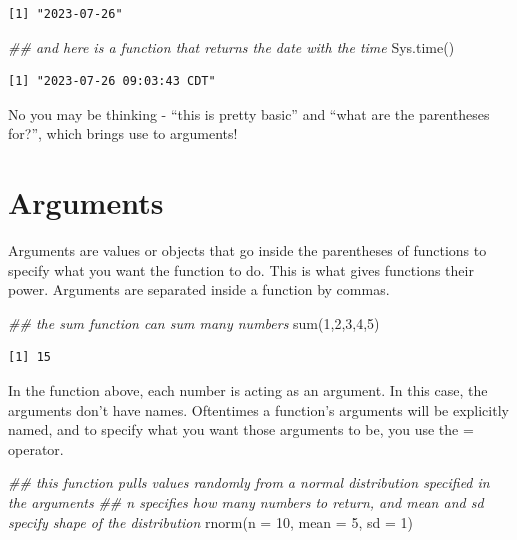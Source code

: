 \documentclass[
  letterpaper,
  DIV=11,
  numbers=noendperiod]{scrreprt}
\newenvironment{Shaded}{\begin{snugshade}}{\end{snugshade}}
\newcommand{\AttributeTok}[1]{\textcolor[rgb]{0.40,0.45,0.13}{#1}}
\newcommand{\DecValTok}[1]{\textcolor[rgb]{0.68,0.00,0.00}{#1}}
\newcommand{\DocumentationTok}[1]{\textcolor[rgb]{0.37,0.37,0.37}{\textit{#1}}}
\newcommand{\FunctionTok}[1]{\textcolor[rgb]{0.28,0.35,0.67}{#1}}
\newcommand{\NormalTok}[1]{\textcolor[rgb]{0.00,0.23,0.31}{#1}}
\begin{document}
\begin{verbatim}
[1] "2023-07-26"
\end{verbatim}

\begin{Shaded}
\begin{Highlighting}[]
\DocumentationTok{\#\# and here is a function that returns the date with the time}
\FunctionTok{Sys.time}\NormalTok{()}
\end{Highlighting}
\end{Shaded}

\begin{verbatim}
[1] "2023-07-26 09:03:43 CDT"
\end{verbatim}

No you may be thinking - ``this is pretty basic'' and ``what are the
parentheses for?'', which brings use to arguments!

\hypertarget{arguments}{%
\section{Arguments}\label{arguments}}

Arguments are values or objects that go inside the parentheses of
functions to specify what you want the function to do. This is what
gives functions their power. Arguments are separated inside a function
by commas.

\begin{Shaded}
\begin{Highlighting}[]
\DocumentationTok{\#\# the sum function can sum many numbers}
\FunctionTok{sum}\NormalTok{(}\DecValTok{1}\NormalTok{,}\DecValTok{2}\NormalTok{,}\DecValTok{3}\NormalTok{,}\DecValTok{4}\NormalTok{,}\DecValTok{5}\NormalTok{)}
\end{Highlighting}
\end{Shaded}

\begin{verbatim}
[1] 15
\end{verbatim}

In the function above, each number is acting as an argument. In this
case, the arguments don't have names. Oftentimes a function's arguments
will be explicitly named, and to specify what you want those arguments
to be, you use the = operator.

\begin{Shaded}
\begin{Highlighting}[]
\DocumentationTok{\#\# this function pulls values randomly from a normal distribution specified in the arguments}
\DocumentationTok{\#\# n specifies how many numbers to return, and mean and sd specify shape of the distribution}
\FunctionTok{rnorm}\NormalTok{(}\AttributeTok{n =} \DecValTok{10}\NormalTok{, }\AttributeTok{mean =} \DecValTok{5}\NormalTok{, }\AttributeTok{sd =} \DecValTok{1}\NormalTok{)}
\end{Highlighting}
\end{Shaded}
\end{document}
